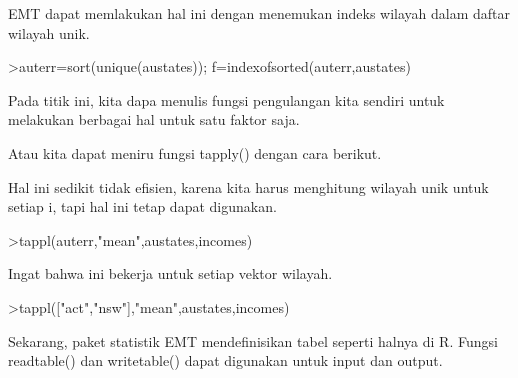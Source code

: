 \documentclass{article}
\begin{document}
\begin{eulernotebook}
\begin{eulercomment}
EMT dapat memlakukan hal ini dengan menemukan indeks wilayah dalam
daftar wilayah unik.
\end{eulercomment}
\begin{eulerprompt}
>auterr=sort(unique(austates)); f=indexofsorted(auterr,austates)
\end{eulerprompt}
\begin{euleroutput}
  [6,  5,  4,  2,  2,  3,  8,  8,  4,  7,  2,  7,  4,  4,  5,  6,  5,  3,
  8,  7,  4,  2,  2,  8,  5,  1,  2,  7,  7,  1]
\end{euleroutput}
\begin{eulercomment}
Pada titik ini, kita dapa menulis fungsi pengulangan kita sendiri
untuk melakukan berbagai hal untuk satu faktor saja.

Atau kita dapat meniru fungsi tapply() dengan cara berikut.
\end{eulercomment}
\begin{eulercomment}
Hal ini sedikit tidak efisien, karena kita harus menghitung wilayah
unik untuk setiap i, tapi hal ini tetap dapat digunakan.
\end{eulercomment}
\begin{eulerprompt}
>tappl(auterr,"mean",austates,incomes)
\end{eulerprompt}
\begin{euleroutput}
  [44.5,  57.3333333333,  55.5,  53.6,  55,  60.5,  56,  52.25]
\end{euleroutput}
\begin{eulercomment}
Ingat bahwa ini bekerja untuk setiap vektor wilayah.
\end{eulercomment}
\begin{eulerprompt}
>tappl(["act","nsw"],"mean",austates,incomes)
\end{eulerprompt}
\begin{euleroutput}
  [44.5,  57.3333333333]
\end{euleroutput}
\begin{eulercomment}
Sekarang, paket statistik EMT mendefinisikan tabel seperti halnya di
R. Fungsi readtable() dan writetable() dapat digunakan untuk input dan
output.


\end{eulercomment}
\end{eulernotebook}
\end{document}
